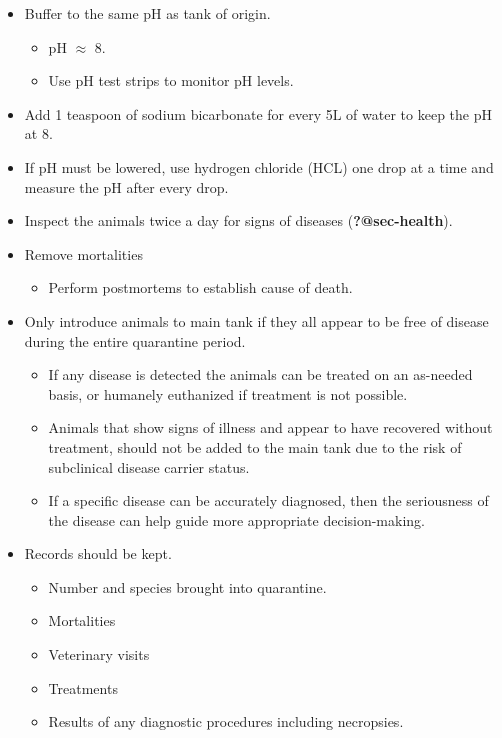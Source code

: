 \documentclass[
  12pt,
]{report}
\providecommand{\tightlist}{%
  \setlength{\itemsep}{0pt}\setlength{\parskip}{0pt}}\usepackage{longtable,booktabs,array}
\begin{document}
\begin{itemize}
\tightlist
\item
  Buffer to the same pH as tank of origin.

  \begin{itemize}
  \tightlist
  \item
    pH \(\approx\) 8.
  \item
    Use pH test strips to monitor pH levels.
  \end{itemize}
\item
  Add 1 teaspoon of sodium bicarbonate for every 5\(\mathrm{L}\) of
  water to keep the pH at 8.
\item
  If pH must be lowered, use hydrogen chloride (HCL) one drop at a time
  and measure the pH after every drop.
\item
  Inspect the animals twice a day for signs of diseases
  (\textbf{?@sec-health}).
\item
  Remove mortalities

  \begin{itemize}
  \tightlist
  \item
    Perform postmortems to establish cause of death.
  \end{itemize}
\item
  Only introduce animals to main tank if they all appear to be free of
  disease during the entire quarantine period.

  \begin{itemize}
  \tightlist
  \item
    If any disease is detected the animals can be treated on an
    as-needed basis, or humanely euthanized if treatment is not
    possible.
  \item
    Animals that show signs of illness and appear to have recovered
    without treatment, should not be added to the main tank due to the
    risk of subclinical disease carrier status.
  \item
    If a specific disease can be accurately diagnosed, then the
    seriousness of the disease can help guide more appropriate
    decision-making.
  \end{itemize}
\item
  Records should be kept.

  \begin{itemize}
  \tightlist
  \item
    Number and species brought into quarantine.
  \item
    Mortalities
  \item
    Veterinary visits
  \item
    Treatments\\
  \item
    Results of any diagnostic procedures including necropsies.
  \end{itemize}
\end{itemize}
\end{document}

